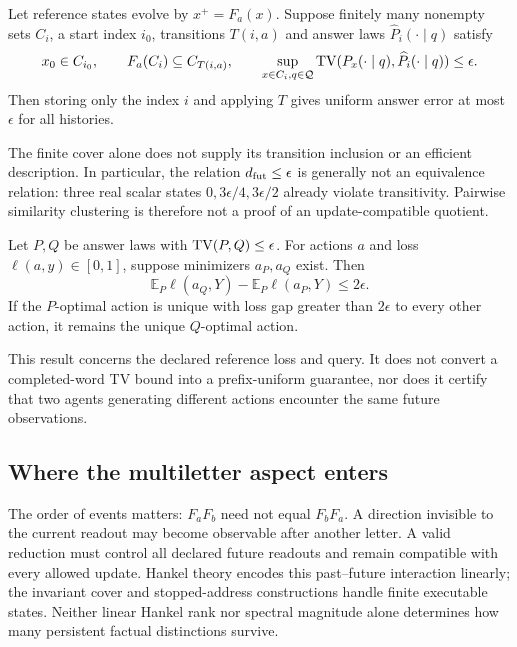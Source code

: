 \begin{proposition}
\label{III:M:prop:agent-cover}
Let reference states evolve by $x^+=F_a(x)$. Suppose finitely many
nonempty sets $C_i$, a start index $i_0$, transitions $T(i,a)$ and
answer laws $\widehat P_i(\cdot\mid q)$ satisfy
\[
 x_0\in C_{i_0},\qquad F_a(C_i)\subseteq C_{T(i,a)},\qquad
 \sup_{x\in C_i,q\in\mathcal Q}\operatorname{TV}(P_x(\cdot\mid q),
                     \widehat P_i(\cdot\mid q))\le\epsilon.
\]
Then storing only the index $i$ and applying $T$ gives uniform answer
error at most $\epsilon$ for all histories.
\end{proposition}

The finite cover alone does not supply its transition inclusion or an
efficient description. In particular, the relation
$d_{\rm fut}\le\epsilon$ is generally not an equivalence relation:
three real scalar states $0,3\epsilon/4,3\epsilon/2$ already violate
transitivity. Pairwise similarity clustering is therefore not a proof
of an update-compatible quotient.

\begin{proposition}\label{III:M:prop:decision-transfer}
Let $P,Q$ be answer laws with $\operatorname{TV}(P,Q)\le\epsilon$. For actions
$a$ and loss $\ell(a,y)\in[0,1]$, suppose minimizers $a_P,a_Q$
exist. Then
\[
 \mathbb E_P\ell(a_Q,Y)-\mathbb E_P\ell(a_P,Y)\le2\epsilon.
\]
If the $P$-optimal action is unique with loss gap greater than
$2\epsilon$ to every other action, it remains the unique $Q$-optimal action.
\end{proposition}

This result concerns the declared reference loss and query. It does not
convert a completed-word TV bound into a prefix-uniform guarantee, nor
does it certify that two agents generating different actions encounter
the same future observations.

\subsection{Where the multiletter aspect enters}
The order of events matters: $F_aF_b$ need not equal $F_bF_a$.
A direction invisible to the current readout may become observable
after another letter. A valid reduction must control all declared future
readouts and remain compatible with every allowed update.
Hankel theory encodes this past--future interaction linearly; the invariant
cover and stopped-address constructions handle finite executable states.
Neither linear Hankel rank nor spectral magnitude alone determines how
many persistent factual distinctions survive.

